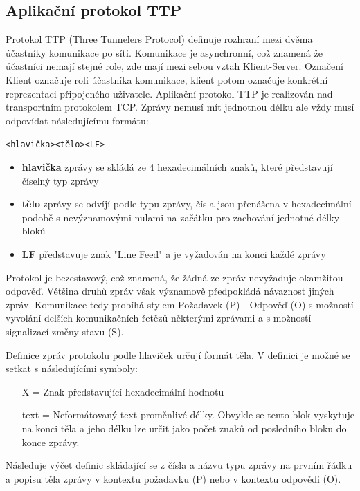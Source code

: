 \documentclass[12pt,a4paper]{article}
\begin{document}
\subsection{Aplikační protokol TTP}
Protokol TTP (Three Tunnelers Protocol) definuje rozhraní mezi dvěma účastníky komunikace po síti. Komunikace je asynchronní, což znamená že účastníci nemají stejné role, zde mají mezi sebou vztah Klient-Server. Označení Klient označuje roli účastníka komunikace, klient potom označuje konkrétní reprezentaci připojeného uživatele.
Aplikační protokol TTP je realizován nad transportním protokolem TCP. Zprávy nemusí mít jednotnou délku ale vždy musí odpovídat následujícímu formátu:
\begin{center}
\texttt{<hlavička><tělo><LF>}
\end{center}
\begin{itemize}
\setlength\itemsep{0em}
\item \textbf{hlavička} zprávy se skládá ze 4 hexadecimálních znaků, které představují číselný typ zprávy
\item \textbf{tělo} zprávy se odvíjí podle typu zprávy, čísla jsou přenášena v hexadecimální podobě s nevýznamovými nulami na začátku pro zachování jednotné délky bloků
\item \textbf{LF} představuje znak "Line Feed" a je vyžadován na konci každé zprávy
\end{itemize}

Protokol je bezestavový, což znamená, že žádná ze zpráv nevyžaduje okamžitou odpověď. Většina druhů zpráv však významově předpokládá návaznost jiných zpráv.
Komunikace tedy probíhá stylem Požadavek (P) - Odpověď (O) s možností vyvolání delších komunikačních řetězů některými zprávami a s možností signalizací změny stavu (S).

Definice zpráv protokolu podle hlaviček určují formát těla. V definici je možné se setkat s následujícími symboly:
\begin{itemize}
\item[X] = Znak představující hexadecimální hodnotu
\item[text] = Neformátovaný text proměnlivé délky. Obvykle se tento blok vyskytuje na konci těla a jeho délku lze určit jako počet znaků od posledního bloku do konce zprávy.
\end{itemize}
Následuje výčet definic skládající se z čísla a názvu typu zprávy na prvním řádku a popisu těla zprávy v kontextu požadavku (P) nebo v kontextu odpovědi (O).
\end{document}
